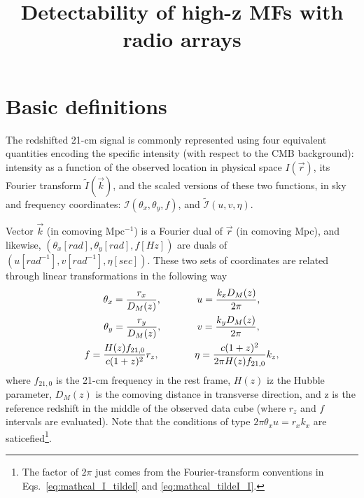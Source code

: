\documentclass[12pt]{paper}
\title{Detectability of high-z MFs with radio arrays}
\begin{document}
\maketitle

\section{Basic definitions}

The redshifted 21-cm signal is commonly represented using four equivalent quantities encoding the specific intensity (with respect to the CMB background): intensity as a function of the observed location in physical space $I(\vec{r})$, its Fourier transform $\widetilde{I}(\vec{k})$, and the scaled versions of these two functions, in sky and frequency coordinates: $\mathcal{I}(\theta_x, \theta_y, f)$, and $\widetilde{\mathcal{I}}(u,v,\eta)$.

Vector $\vec{k}$ (in comoving Mpc$^{-1}$) is a Fourier dual of $\vec{r}$ (in comoving Mpc), and likewise, $(\theta_x[rad], \theta_y[rad], f[Hz])$ are duals of $(u[rad^{-1}], v[rad^{-1}], \eta[sec])$. These two sets of coordinates are related through linear transformations in the following way
\begin{equation}
\begin{gathered}
\theta_x = \frac{r_x}{D_M(z)}, \hspace{0.5in} u = \frac{k_xD_M(z)}{2\pi},\\
\theta_y = \frac{r_y}{D_M(z)}, \hspace{0.5in} v = \frac{k_yD_M(z)}{2\pi},\\
f = \frac{H(z)f_{21,0}}{c(1+z)^2} r_z, \hspace{0.5in} \eta = \frac{c(1+z)^2}{2\pi H(z)f_{21,0}}k_z,
\end{gathered}
\label{eq:fourier_duals}
\end{equation} 
where $f_{21,0}$ is the 21-cm frequency in the rest frame, $H(z)$ iz the Hubble parameter, $D_M(z)$ is the comoving distance in transverse direction, and z is the reference redshift in the middle of the observed data cube (where $r_z$ and $f$ intervals are evaluated). Note that the conditions of type $2\pi\theta_xu = r_xk_x$ are saticefied\footnote{The factor of $2\pi$ just comes from the Fourier-transform conventions in Eqs.~\ref{eq:mathcal_I_tildeI} and \ref{eq:mathcal_tildeI_I}.}.
\end{document}
